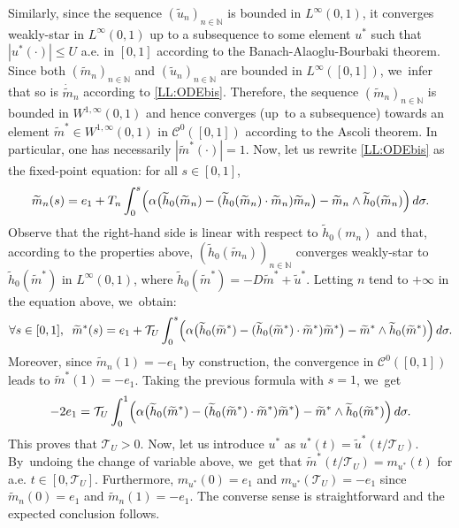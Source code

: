 \documentclass[JEP,XML,SOM,Unicode,NoEqCountersInSection,NoFloatCountersInSection,published]{cedram}
\theoremstyle{definition}
\newcommand{\N} {\mathbb{N}}
\begin{document}
Similarly, since the sequence $(\widetilde u_n)_{n\in\N}$ is bounded in $L^\infty(0,1)$, it converges weakly-star in $L^\infty(0,1)$ up to a subsequence to some element $u^*$ such that $|u^*(\cdot)|\leq U $ a.e. in $[0,1]$ according to the Banach-Alaoglu-Bourbaki theorem. Since both $(\widetilde m_{n})_{n\in \N}$ and $(\widetilde u_n)_{n\in \N}$ are bounded in $L^\infty([0,1])$, we~infer that so is $\dot{\widetilde m}_{n}$ according to \eqref{LL:ODEbis}. Therefore, the sequence $(\widetilde m_{n})_{n\in \N}$ is bounded in $W^{1,\infty}(0,1)$ and hence converges (up~to a subsequence) towards an element $\widetilde{m}^*\in W^{1,\infty}(0,1)$ in $\mathcal{C}^0([0,1])$ according to the Ascoli theorem. In particular, one has necessarily $|\widetilde{m}^*(\cdot)|=1$. Now, let us rewrite \eqref{LL:ODEbis} as the fixed-point equation: for all $s\in [0,1]$,
\[
\widetilde m_{n}(s)=e_1+T_n\int_0^s\Bigl(\alpha \bigl(\widetilde h_0(\widetilde m_{n})-(\widetilde h_0(\widetilde m_{n})\cdot \widetilde m_{n}) \widetilde m_{n}\bigr)-\widetilde m_{n}\wedge \widetilde h_0(\widetilde m_{n})\Bigr)\, d\sigma .
\]
Observe that the right-hand side is linear with respect to $\widetilde h_0(m_{n})$ and that, according to the properties above, $(\widetilde h_0(\widetilde m_{n}))_{n\in \N}$ converges weakly-star to $\widetilde h_0(\widetilde m^*)$ in $L^\infty(0,1)$, where $\widetilde{h}_0(\widetilde{m}^*)=-D\widetilde{m}^*+\widetilde{u}^*$. Letting $n$ tend to $+\infty$ in the equation above, we~obtain:
\[
\forall s\in [0,1], \;\; \widetilde m^*(s)=e_1+\mathcal{T}_U\int_0^s\Bigl(\alpha \bigl(\widetilde h_0(\widetilde m^*)-(\widetilde h_0(\widetilde m^*)\cdot \widetilde m^*) \widetilde m^*\bigr)-\widetilde m^*\wedge \widetilde h_0(\widetilde m^*) \Bigr)\, d\sigma.
\]
Moreover, since $\tilde{m}_n (1) = - e_1$ by construction, the convergence in $\mathcal{C}^0 ([0, 1])$ leads to $\tilde{m}^* (1) = - e_1$. Taking the previous formula with $s=1$, we~get
\begin{equation*}
- 2 e_1 = \mathcal{T}_U\int_0^1\Bigl(\alpha \bigl(\widetilde h_0(\widetilde m^*)-(\widetilde h_0(\widetilde m^*)\cdot \widetilde m^*) \widetilde m^*\bigr)-\widetilde m^*\wedge \widetilde h_0(\widetilde m^*)\Bigr)\, d\sigma.
\end{equation*}
This proves that $\mathcal{T}_U > 0$.
Now, let us introduce $u^*$ as $u^*(t)=\widetilde{u}^*(t/\mathcal{T}_U)$. By~undoing the change of variable above, we~get that $\widetilde{m}^*(t/\mathcal{T}_U)=m_{u^*}(t)$ for a.e. $t\in [0,\mathcal{T}_U]$. Furthermore, $m_{u^*}(0)=e_1$ and $m_{u^*}(\mathcal{T}_U)=-e_1$ since $\widetilde{m}_n(0)=e_1$ and $\widetilde{m}_n(1)=-e_1$. The converse sense is straightforward and the expected conclusion follows.
\end{document}
